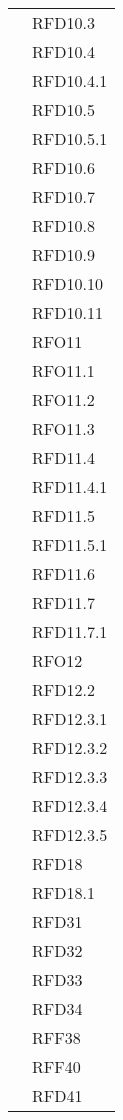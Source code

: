 \begin{longtable}{|>{\centering}m{10cm}|m{3cm}<{\centering}|}
& RFD10.3\\
& RFD10.4\\
& RFD10.4.1\\
& RFD10.5\\
& RFD10.5.1\\
& RFD10.6\\
& RFD10.7\\
& RFD10.8\\
& RFD10.9\\
& RFD10.10\\
& RFD10.11\\
& RFO11\\
& RFO11.1\\
& RFO11.2\\
& RFO11.3\\
& RFD11.4\\
& RFD11.4.1\\
& RFD11.5\\
& RFD11.5.1\\
& RFD11.6\\
& RFD11.7\\
& RFD11.7.1\\
& RFO12\\
& RFD12.2\\
& RFD12.3.1\\
& RFD12.3.2\\
& RFD12.3.3\\
& RFD12.3.4\\
& RFD12.3.5\\
& RFD18\\
& RFD18.1\\
& RFD31\\
& RFD32\\
& RFD33\\
& RFD34\\
& RFF38\\
& RFF40\\
& RFD41\\ \hline


\end{longtable}
